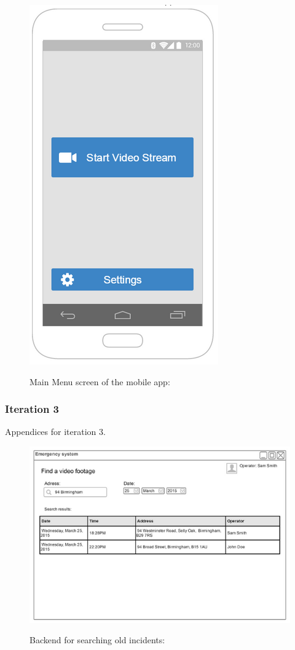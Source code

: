 \documentclass{article}
\begin{document}
    
	
	\begin{figure}[h]
		\centering
		\includegraphics[width=.6\textwidth]{"VideoStream/16"}

		Main Menu screen of the mobile app:
	\end{figure} \clearpage
    
	
    \subsubsection{Iteration 3} Appendices for iteration 3.
	\begin{figure}[h]
		\centering
		\includegraphics[width=.9\textwidth]{"VideoStream/17"}

		Backend for searching old incidents:
		
	\vspace{-5pt}
	\end{figure}
    
\end{document}
